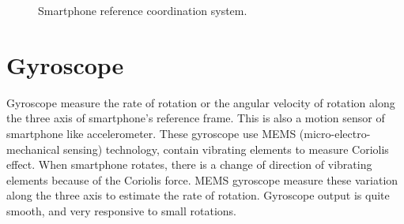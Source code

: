 \begin{figure}[!ht]
\centering
{}

\caption{Smartphone reference coordination system.}
\label{f:coord_dia}
\end{figure}

\section{Gyroscope}
Gyroscope measure the rate of rotation or the angular velocity of rotation along the three axis of smartphone's reference frame.
This is also a motion sensor of smartphone like accelerometer.
These gyroscope use MEMS (micro-electro-mechanical sensing) technology, contain vibrating elements to measure Coriolis effect.
When smartphone rotates, there is a change of direction of vibrating elements because of the Coriolis force.
MEMS gyroscope measure these variation along the three axis to estimate the rate of rotation.
Gyroscope output is quite smooth, and very responsive to small rotations.

